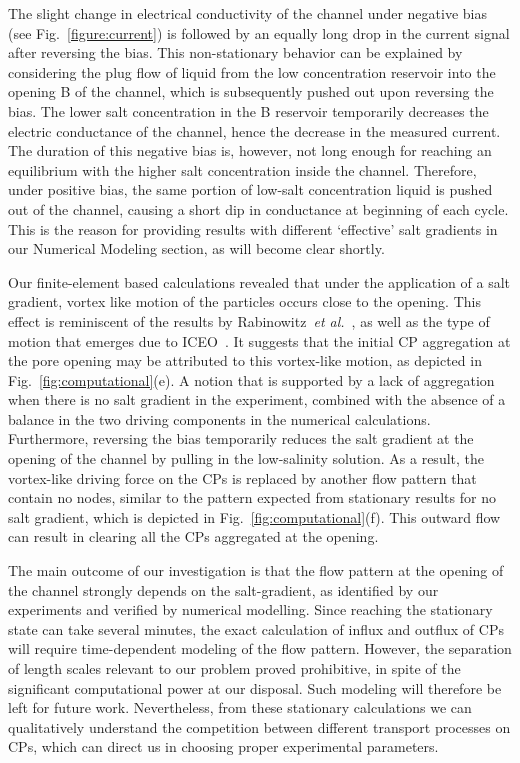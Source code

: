\documentclass[twoside,twocolumn,9pt]{article}
\begin{document}
The slight change in electrical conductivity of the channel under negative bias (see Fig.~\ref{figure:current}) is followed by an equally long drop in the current signal after reversing the bias.
This non-stationary behavior can be explained by considering the plug flow of liquid from the low concentration reservoir into the opening B of the channel, which is subsequently pushed out upon reversing the bias. 
The lower salt concentration in the B reservoir temporarily decreases the electric conductance of the channel, hence the decrease in the measured current. 
The duration of this negative bias is, however, not long enough for reaching an equilibrium with the higher salt concentration inside the channel. 
Therefore, under positive bias, the same portion of low-salt concentration liquid is pushed out of the channel, causing a short dip in conductance at beginning of each cycle. This is the reason for providing results with different `effective' salt gradients in our Numerical Modeling section, as will become clear shortly.

Our finite-element based calculations revealed that under the application of a salt gradient, vortex like motion of the particles occurs close to the opening. This effect is reminiscent of the results by Rabinowitz~\textit{et al.}~\cite{rabinowitz_nanoscale_2019}, as well as the type of motion that emerges due to ICEO~\cite{squires_bazant_2004}. It suggests that the initial CP aggregation at the pore opening may be attributed to this vortex-like motion, as depicted in Fig.~\ref{fig:computational}(e). A notion that is supported by a lack of aggregation when there is no salt gradient in the experiment, combined with the absence of a balance in the two driving components in the numerical calculations. Furthermore, reversing the bias temporarily reduces the salt gradient at the opening of the channel by pulling in the low-salinity solution. As a result, the vortex-like driving force on the CPs is replaced by another flow pattern that contain no nodes, similar to the pattern expected from stationary results for no salt gradient, which is depicted in Fig.~\ref{fig:computational}(f).
This outward flow can result in clearing all the CPs aggregated at the opening.

The main outcome of our investigation is that the flow pattern at the opening of the channel strongly depends on the salt-gradient, as identified by our experiments and verified by numerical modelling. 
Since reaching the stationary state can take several minutes, the exact calculation of influx and outflux of CPs will require time-dependent modeling of the flow pattern. However, the separation of length scales relevant to our problem proved prohibitive, in spite of the significant computational power at our disposal. Such modeling will therefore be left for future work.
Nevertheless, from these stationary calculations we can qualitatively understand the competition between different transport processes on CPs, which can direct us in choosing proper experimental parameters. 
\end{document}
